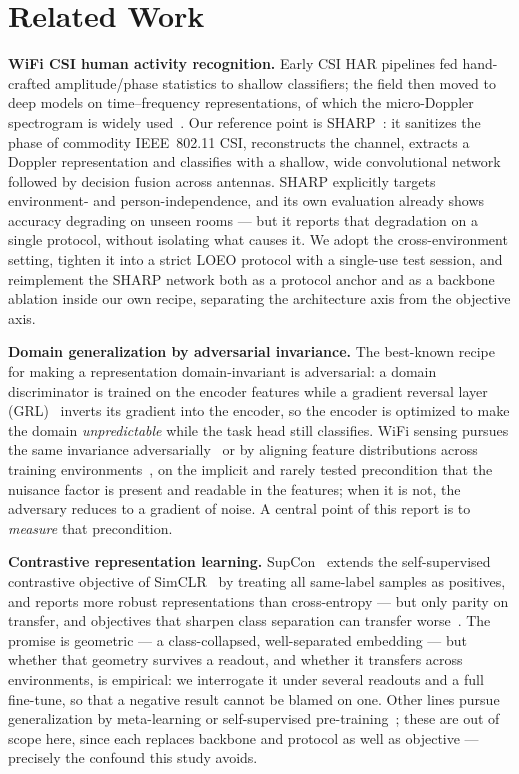 
\section{Related Work}
\label{sec:related_work}

\textbf{WiFi CSI human activity recognition.} Early CSI HAR pipelines fed
hand-crafted amplitude/phase statistics to shallow classifiers; the field then
moved to deep models on time--frequency representations, of which the
micro-Doppler spectrogram is widely used~\cite{Wang-2019,Wang-2026}. Our reference point is SHARP~\cite{Meneghello-2023}:
it sanitizes the phase of commodity IEEE~802.11 CSI, reconstructs the channel,
extracts a Doppler representation and classifies with a shallow, wide
convolutional network followed by decision fusion across antennas. SHARP
explicitly targets environment- and person-independence, and its own
evaluation already shows accuracy degrading on unseen rooms --- but it reports
that degradation on a single protocol, without isolating what causes it. We
adopt the cross-environment setting, tighten it into a strict LOEO protocol
with a single-use test session, and reimplement the SHARP network both as a
protocol anchor and as a backbone ablation inside our own recipe, separating
the architecture axis from the objective axis.

\textbf{Domain generalization by adversarial invariance.} The best-known
recipe for making a representation domain-invariant is adversarial: a domain
discriminator is trained on the encoder features while a gradient reversal
layer (GRL)~\cite{Ganin-2016} inverts its gradient into the encoder, so the
encoder is optimized to make the domain \emph{unpredictable} while the task
head still classifies. WiFi sensing pursues the same invariance
adversarially~\cite{Wang-2021} or by aligning feature distributions across
training environments~\cite{Wang-2024}, on the implicit and rarely tested
precondition that the nuisance factor is present and readable in the features;
when it is not, the adversary reduces to a gradient of noise. A central point
of this report is to \emph{measure} that precondition.

\textbf{Contrastive representation learning.} SupCon~\cite{Khosla-2020}
extends the self-supervised contrastive objective of SimCLR~\cite{Chen-2020} by treating all
same-label samples as positives, and reports more robust representations than
cross-entropy --- but only parity on transfer, and objectives that sharpen
class separation can transfer worse~\cite{Kornblith-2021}.
The promise is geometric ---
a class-collapsed, well-separated embedding --- but whether that geometry
survives a readout, and whether it transfers across environments, is
empirical: we interrogate it under several readouts and a full fine-tune, so
that a negative result cannot be blamed on one. Other lines pursue
generalization by meta-learning or self-supervised
pre-training~\cite{Wang-2026}; these are out of scope here, since each replaces
backbone and protocol as well as objective --- precisely the confound this
study avoids.
